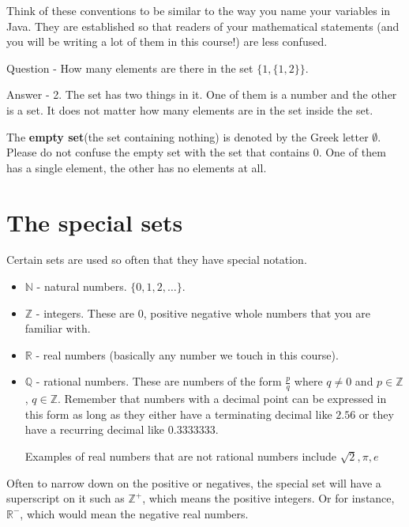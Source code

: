 \documentclass[12pt]{article}
\begin{document}
Think of these conventions to be similar to the way you name your variables in Java. They are established so that readers of your mathematical statements (and you will be writing a lot of them in this course!) are less confused.

\bigskip

Question - How many elements are there in the set $\{1, \{1,2\}\}$. 

Answer - 2. The set has two things in it. One of them is a number and the other is a set. It does not matter how many elements are in the set inside the set.

\bigskip

The {\bf empty set}(the set containing nothing) is denoted by the Greek letter $\emptyset$. Please do not confuse the empty set with the set that contains $0$. One of them has a single element, the other has no elements at all.

\section*{The special sets}

Certain sets are used so often that they have special notation.

\begin{itemize}

\item $\mathbb{N}$ - natural numbers. $\{0, 1, 2, \ldots\}$.

\item $\mathbb{Z}$ - integers. These are 0, positive negative whole numbers that you are familiar with. 

\item $\mathbb{R}$ - real numbers (basically any number we touch in this course). 

\item $\mathbb{Q}$ - rational numbers. These are numbers of the form $\frac{p}{q}$ where $q \neq 0 $ and $p \in \mathbb{Z}$, $q \in \mathbb{Z}$. Remember that numbers with a decimal point can be expressed in this form as long as they either have a terminating decimal like 
$2.56$ or they have a recurring decimal like $0.3333333$.

Examples of real numbers that are not rational numbers include $\sqrt{2}, \pi, e$

\end{itemize}

Often to narrow down on the positive or negatives, the special set will have a superscript on it such as $\mathbb{Z}^+$, which means the positive integers.
Or for instance, $\mathbb{R}^-$, which would mean the negative real numbers.
\end{document}
